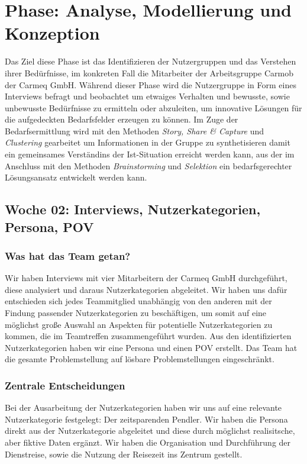 \documentclass{article}
\begin{document}
\section{Phase: Analyse, Modellierung und Konzeption}

Das Ziel diese Phase ist das Identifizieren der Nutzergruppen und das Verstehen ihrer Bed\"urfnisse, im konkreten Fall die Mitarbeiter der Arbeitsgruppe Carmob der Carmeq GmbH. W\"ahrend dieser Phase wird die Nutzergruppe in Form eines Interviews befragt und beobachtet um etwaiges Verhalten und bewusste, sowie unbewusste Bed\"urfnisse zu ermitteln oder abzuleiten, um innovative L\"osungen f\"ur die aufgedeckten Bedarfsfelder erzeugen zu k\"onnen. Im Zuge der Bedarfsermittlung wird mit den Methoden \textit{Story, Share \& Capture} und \textit{Clustering} gearbeitet um Informationen in der Gruppe zu synthetisieren damit ein gemeinsames Verst\"andins der Ist-Situation erreicht werden kann, aus der im Anschluss mit den Methoden \textit{Brainstorming} und \textit{Selektion} ein bedarfsgerechter L\"osungsansatz entwickelt werden kann. 

\subsection{Woche 02: Interviews, Nutzerkategorien, Persona, POV}

\subsubsection{Was hat das Team getan?}

Wir haben Interviews mit vier Mitarbeitern der Carmeq GmbH durchgef\"uhrt, diese analysiert und daraus Nutzerkategorien abgeleitet. Wir haben uns daf\"ur entschieden sich jedes Teammitglied unabh\"angig von den anderen mit der Findung passender Nutzerkategorien zu besch\"aftigen, um somit auf eine m\"oglichst gro\ss e Auswahl an Aspekten f\"ur potentielle Nutzerkategorien zu kommen, die im Teamtreffen zusammengef\"uhrt wurden. Aus den identifizierten Nutzerkategorien haben wir eine Persona und einen POV erstellt. Das Team hat die gesamte Problemstellung auf l\"osbare Problemstellungen eingeschr\"ankt.

\subsubsection{Zentrale Entscheidungen}

Bei der Ausarbeitung der Nutzerkategorien haben wir uns auf eine relevante Nutzerkategorie festgelegt: Der zeitsparenden Pendler. Wir haben die Persona direkt aus der Nutzerkategorie abgeleitet und diese durch m\"oglichst realisitsche, aber fiktive Daten erg\"anzt. Wir haben die Organisation und Durchf\"uhrung der Dienstreise, sowie die Nutzung der Reisezeit ins Zentrum gestellt.
\end{document}
